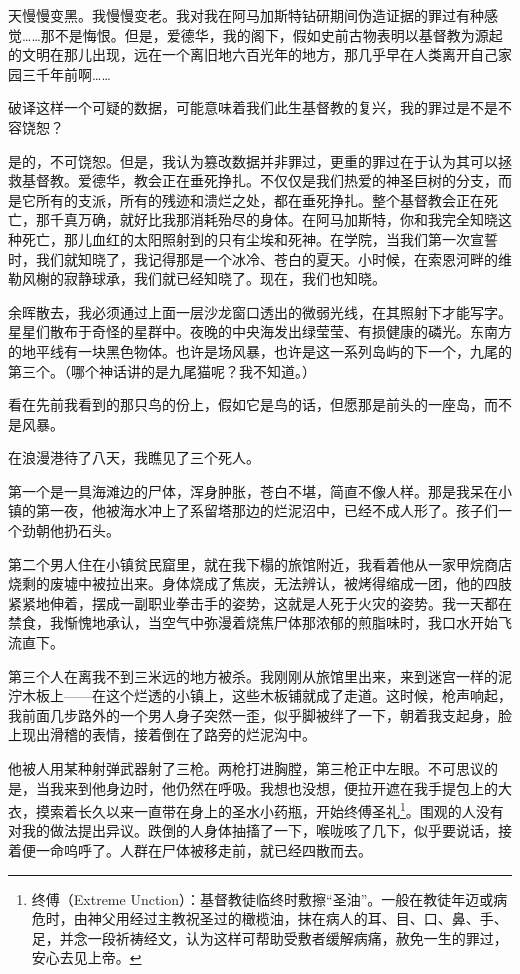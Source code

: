 \documentclass[AutoFakeBold=true]{book}
\begin{document}
天慢慢变黑。我慢慢变老。我对我在阿马加斯特钻研期间伪造证据的罪过有种感觉……那不是悔恨。但是，爱德华，我的阁下，假如史前古物表明以基督教为源起的文明在那儿出现，远在一个离旧地六百光年的地方，那几乎早在人类离开自己家园三千年前啊……

破译这样一个可疑的数据，可能意味着我们此生基督教的复兴，我的罪过是不是不容饶恕？

是的，不可饶恕。但是，我认为篡改数据并非罪过，更重的罪过在于认为其可以拯救基督教。爱德华，教会正在垂死挣扎。不仅仅是我们热爱的神圣巨树的分支，而是它所有的支派，所有的残迹和溃烂之处，都在垂死挣扎。整个基督教会正在死亡，那千真万确，就好比我那消耗殆尽的身体。在阿马加斯特，你和我完全知晓这种死亡，那儿血红的太阳照射到的只有尘埃和死神。在学院，当我们第一次宣誓时，我们就知晓了，我记得那是一个冰冷、苍白的夏天。小时候，在索恩河畔的维勒风榭的寂静球承，我们就已经知晓了。现在，我们也知晓。

余晖散去，我必须通过上面一层沙龙窗口透出的微弱光线，在其照射下才能写字。星星们散布于奇怪的星群中。夜晚的中央海发出绿莹莹、有损健康的磷光。东南方的地平线有一块黑色物体。也许是场风暴，也许是这一系列岛屿的下一个，九尾的第三个。（哪个神话讲的是九尾猫呢？我不知道。）

看在先前我看到的那只鸟的份上，假如它是鸟的话，但愿那是前头的一座岛，而不是风暴。

\vspace*{1em}{\kaishu 第二十八日：}

在浪漫港待了八天，我瞧见了三个死人。

第一个是一具海滩边的尸体，浑身肿胀，苍白不堪，简直不像人样。那是我呆在小镇的第一夜，他被海水冲上了系留塔那边的烂泥沼中，已经不成人形了。孩子们一个劲朝他扔石头。

第二个男人住在小镇贫民窟里，就在我下榻的旅馆附近，我看着他从一家甲烷商店烧剩的废墟中被拉出来。身体烧成了焦炭，无法辨认，被烤得缩成一团，他的四肢紧紧地伸着，摆成一副职业拳击手的姿势，这就是人死于火灾的姿势。我一天都在禁食，我惭愧地承认，当空气中弥漫着烧焦尸体那浓郁的煎脂味时，我口水开始飞流直下。

第三个人在离我不到三米远的地方被杀。我刚刚从旅馆里出来，来到迷宫一样的泥泞木板上——在这个烂透的小镇上，这些木板铺就成了走道。这时候，枪声响起，我前面几步路外的一个男人身子突然一歪，似乎脚被绊了一下，朝着我支起身，脸上现出滑稽的表情，接着倒在了路旁的烂泥沟中。

他被人用某种射弹武器射了三枪。两枪打进胸膛，第三枪正中左眼。不可思议的是，当我来到他身边时，他仍然在呼吸。我想也没想，便拉开遮在我手提包上的大衣，摸索着长久以来一直带在身上的圣水小药瓶，开始终傅圣礼\footnote{终傅（Extreme Unction）：基督教徒临终时敷擦``圣油''。一般在教徒年迈或病危时，由神父用经过主教祝圣过的橄榄油，抹在病人的耳、目、口、鼻、手、足，并念一段祈祷经文，认为这样可帮助受敷者缓解病痛，赦免一生的罪过，安心去见上帝。}。围观的人没有对我的做法提出异议。跌倒的人身体抽搐了一下，喉咙咳了几下，似乎要说话，接着便一命呜呼了。人群在尸体被移走前，就已经四散而去。
\end{document}

